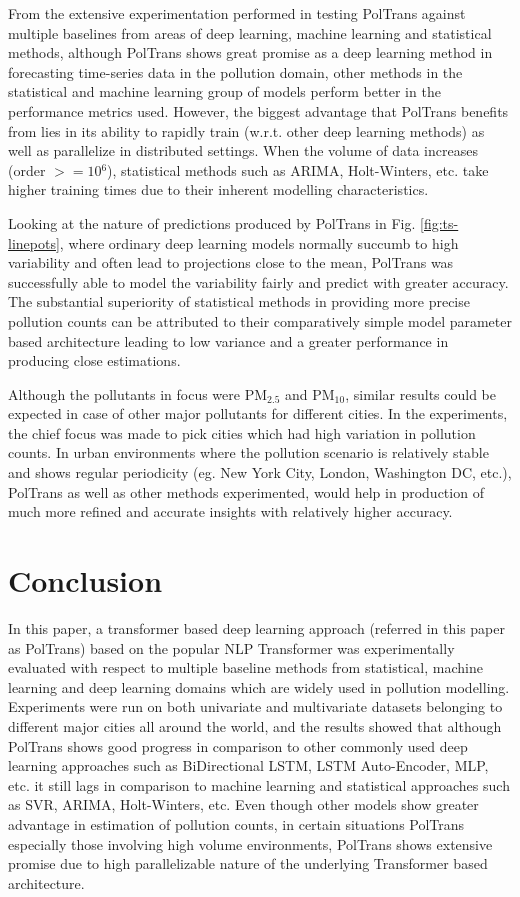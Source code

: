 \documentclass[10pt,journal]{IEEEtran}
\begin{document}
From the extensive experimentation performed in testing {PolTrans} against multiple baselines from areas of deep learning, machine learning and statistical methods, although {PolTrans} shows great promise as a deep learning method in forecasting time-series data in the pollution domain, other methods in the statistical and machine learning group of models perform better in the performance metrics used. However, the biggest advantage that {PolTrans} benefits from lies in its ability to rapidly train (w.r.t. other deep learning methods) as well as parallelize in distributed settings. When the volume of data increases (order ${>= 10{^{6}}}$), statistical methods such as ARIMA, Holt-Winters, etc. take higher training times due to their inherent modelling characteristics.

Looking at the nature of predictions produced by {PolTrans} in Fig. \ref{fig:ts-linepots}, where ordinary deep learning models normally succumb to high variability and often lead to projections close to the mean, {PolTrans} was successfully able to model the variability fairly and predict with greater accuracy. The substantial superiority of statistical methods in providing more precise pollution counts can be attributed to their comparatively simple model parameter based architecture leading to low variance and a greater performance in producing close estimations.

Although the pollutants in focus were PM${_{2.5}}$ and PM${_{10}}$, similar results could be expected in case of other major pollutants for different cities. In the experiments, the chief focus was made to pick cities which had high variation in pollution counts. In urban environments where the pollution scenario is relatively stable and shows regular periodicity (eg. New York City, London, Washington DC, etc.), {PolTrans} as well as other methods experimented, would help in production of much more refined and accurate insights with relatively higher accuracy.

\section{Conclusion}
\label{sec:conclusion}

In this paper, a transformer based deep learning approach (referred in this paper as {PolTrans}) based on the popular NLP Transformer was experimentally evaluated with respect to multiple baseline methods from statistical, machine learning and deep learning domains which are widely used in pollution modelling. Experiments were run on both univariate and multivariate datasets belonging to different major cities all around the world, and the results showed that although {PolTrans} shows good progress in comparison to other commonly used deep learning approaches such as BiDirectional LSTM, LSTM Auto-Encoder, MLP, etc. it still lags in comparison to machine learning and statistical approaches such as SVR, ARIMA, Holt-Winters, etc. Even though other models show greater advantage in estimation of pollution counts, in certain situations {PolTrans} especially those involving high volume environments, {PolTrans} shows extensive promise due to high parallelizable nature of the underlying Transformer based architecture.
\end{document}
